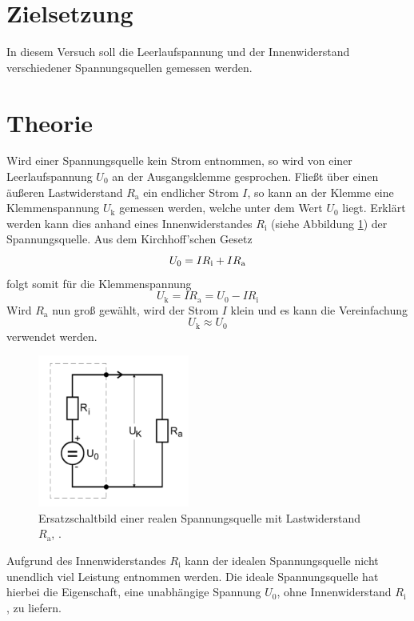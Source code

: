 \section{Zielsetzung}
In diesem Versuch soll die Leerlaufspannung und der Innenwiderstand verschiedener Spannungsquellen gemessen werden.

\section{Theorie}
Wird einer Spannungsquelle kein Strom entnommen, so wird von einer Leerlaufspannung $U_0$ an der Ausgangsklemme gesprochen. 
Fließt über einen äußeren Lastwiderstand $R_\text{a}$ ein endlicher Strom $I$, so kann an der Klemme eine Klemmenspannung $U_\text{k}$ gemessen werden, welche unter dem Wert $U_0$ liegt. Erklärt werden kann dies anhand eines Innenwiderstandes $R_\text{i}$ (siehe Abbildung \ref{fig:Skizze}) der Spannungsquelle. Aus dem Kirchhoff'schen Gesetz
\begin{equation}
	U_0 = I R_\text{i} + I R_\text{a} \notag
\end{equation}
folgt somit für die Klemmenspannung
\begin{equation}
	U_\text{k} = I R_\text{a} = U_0 - I R_\text{i}
\end{equation}
Wird $R_\text{a}$ nun groß gewählt, wird der Strom $I$ klein und es kann die Vereinfachung 
\begin{equation}
	U_\text{k} \approx U_0
\end{equation}
verwendet werden.
\begin{figure}[h]
  \centering
  \includegraphics[height=5cm]{Grafiken/Skizze.pdf}
  \caption{Ersatzschaltbild einer realen Spannungsquelle mit Lastwiderstand $R_\text{a}$, \cite{1}.}
  \label{fig:Skizze}
\end{figure}
Aufgrund des Innenwiderstandes $R_\text{i}$ kann der idealen Spannungsquelle nicht unendlich viel Leistung entnommen werden. 
Die ideale Spannungsquelle hat hierbei die Eigenschaft, eine unabhängige Spannung $U_0$, ohne Innenwiderstand $R_\text{i}$, zu liefern.
